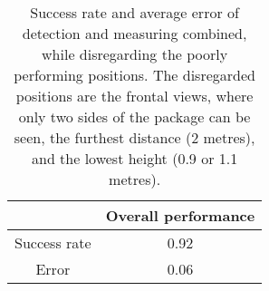 \begin{table}%
\centering
\begin{tabular}{@{} *2c @{}}
\toprule
 & {Overall performance}\\ 
\midrule
Success rate	& 0.92 \\ 
Error 			& 0.06 \\
\bottomrule 
 \end{tabular}
 \caption{Success rate and average error of detection and measuring combined, while disregarding the poorly performing positions. The disregarded positions are the frontal views, where only two sides of the package can be seen, the furthest distance (2 metres), and the lowest height (0.9 or 1.1 metres). }
\label{table:overall_good}
\end{table}